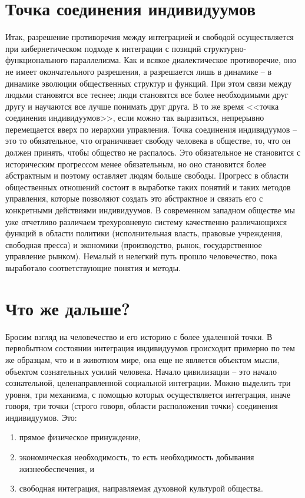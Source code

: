 \documentclass{book}
\begin{document}
\section{Точка соединения индивидуумов}

Итак, разрешение противоречия между интеграцией и свободой осуществляется при кибернетическом подходе к интеграции с позиций структурно-функционального параллелизма. Как и всякое диалектическое противоречие, оно не имеет окон­чательного разрешения, а разрешается лишь в динамике -- в динамике эволюции общественных структур и функций. При этом связи между людьми становятся все теснее; люди становятся все более необходимыми друг другу и научаются все лучше понимать друг друга. В то же время <<точка соединения индивидуумов>>, если можно так выразиться, непрерывно перемещается вверх по иерархии управления. Точка соединения индивидуумов -- это то обязательное, что ограничивает свободу человека в обществе, то, что он должен принять, чтобы общество не распалось. Это обязательное не становится с историческим прогрессом менее обязательным, но оно становится более абстрактным  и поэтому оставляет людям больше свободы. Прогресс в области общественных отношений состоит в выработке таких понятий и таких методов управления, 
которые позволяют создать это абстрактное и связать его с конкретными действиями индивидуумов. В современном западном обществе мы уже отчетливо различаем трехуровневую систему качественно различающихся функций в области политики (исполни­тельная власть, правовые учреждения, свободная пресса) и эко­номики (производство, рынок, государственное управление рынком). Немалый и нелегкий путь прошло человечество, пока выработало соответствующие понятия и методы.



\section{Что же дальше?}

Бросим взгляд на человечество и его историю с более уда­ленной точки. В первобытном состоянии интеграция индивиду­умов происходит примерно по тем же образцам, что и в живот­ном мире, она еще не является объектом мысли, объектом со­знательных усилий человека. Начало цивилизации -- это начало сознательной, целенаправленной социальной интеграции. Можно выделить три уровня, три механизма, с помощью которых осуществляется интеграция, иначе говоря, три точки (строго говоря, области расположения точки) соединения индивидуумов. Это:
\begin{enumerate}
 \item прямое физическое принуждение,
 \item экономическая необходимость, то есть необходимость добывания жизнеобеспечения, и
 \item свободная интеграция, направляемая духовной культурой общества. 
\end{enumerate}
\end{document}
